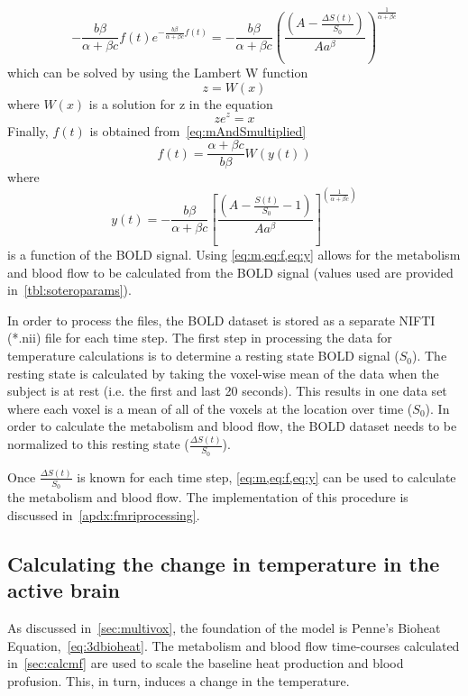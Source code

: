     \begin{equation} \label{eq:mAndSmultiplied}
      -\frac{b\beta}{\alpha+\beta c} f(t)e^{-\frac{b \beta}{\alpha + \beta c}f(t)}=-\frac{b\beta}{\alpha+\beta c} \left(\frac{\left(A-\frac{\Delta S(t)}{S_0}\right)}{A a^\beta}\right)^{\frac{1}{\alpha+\beta c}}
    \end{equation}
  which can be solved by using the Lambert W function
    \begin{equation} \label{eq:lambertW}
      z=W(x)
    \end{equation}
  where $W(x)$ is a solution for z in the equation
    \begin{equation} \label{eq:lambertWsetup}
      z e^z = x
    \end{equation}
  Finally, $f(t)$ is obtained from~\cref{eq:mAndSmultiplied}
    \begin{equation} \label{eq:f}
      f(t)=\frac{\alpha+\beta c}{b \beta}W(y(t))
    \end{equation}
  where
    \begin{equation} \label{eq:y} 
    	y(t)=-\frac{b \beta}{\alpha+\beta c} \left[\frac{(A-\frac{S(t)}{S_{0}}-1)}{A a^{\beta}}\right]^{\left(\frac{1}{\alpha+\beta c}\right)} 
    \end{equation}
  is a function of the BOLD signal.  Using \cref{eq:m,eq:f,eq:y} allows for the metabolism and blood flow to be calculated from the BOLD signal (values used are provided in~\cref{tbl:soteroparams}).
  
    In order to process the files, the BOLD dataset is stored as a separate NIFTI (*.nii) file for each time step.  The first step in processing the data for temperature calculations is to determine a resting state BOLD signal ($S_0$).  The resting state is calculated by taking the voxel-wise mean of the data when the subject is at rest (i.e. the first and last 20 seconds).  This results in one data set where each voxel is a mean of all of the voxels at the location over time ($S_0$).  In order to calculate the metabolism and blood flow, the BOLD dataset needs to be normalized to this resting state ($\frac{\Delta S(t)}{S_0}$).  
    
    Once $\frac{\Delta S(t)}{S_0}$ is known for each time step, \cref{eq:m,eq:f,eq:y} can be used to calculate the metabolism and blood flow. The implementation of this procedure is discussed in~\cref{apdx:fmriprocessing}. 

    \subsection{\label{sec:calcT} Calculating the change in temperature in the active brain}
    As discussed in~\cref{sec:multivox}, the foundation of the model is Penne's Bioheat Equation,~\cref{eq:3dbioheat}.  The metabolism and blood flow time-courses calculated in~\cref{sec:calcmf} are used to scale the baseline heat production and blood profusion.  This, in turn, induces a change in the temperature.
    
